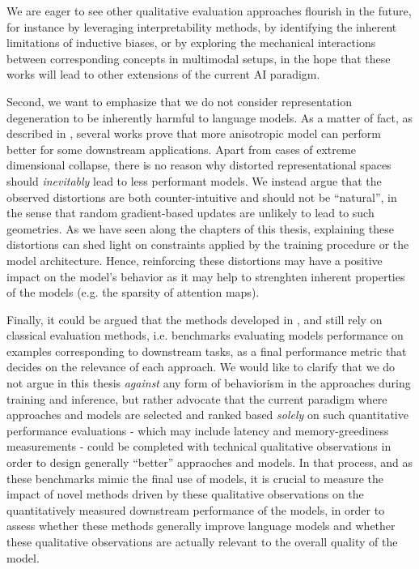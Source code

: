 We are eager to see other qualitative evaluation approaches flourish in the future, for instance by leveraging interpretability methods, by identifying the inherent limitations of inductive biases, or by exploring the mechanical interactions between corresponding concepts in multimodal setups, in the hope that these works will lead to other extensions of the current AI paradigm.

Second, we want to emphasize that we do not consider representation degeneration to be inherently harmful to language models. As a matter of fact, as described in , several works prove that more anisotropic model can perform better for some downstream applications. Apart from cases of extreme dimensional collapse, there is no reason why distorted representational spaces should \textit{inevitably} lead to less performant models. We instead argue that the observed distortions are both counter-intuitive and should not be ``natural'', in the sense that random gradient-based updates are unlikely to lead to such geometries. As we have seen along the chapters of this thesis, explaining these distortions can shed light on constraints applied by the training procedure or the model architecture. Hence, reinforcing these distortions may have a positive impact on the model's behavior as it may help to strenghten inherent properties of the models (e.g. the sparsity of attention maps).

Finally, it could be argued that the methods developed in ,  and  still rely on classical evaluation methods, i.e. benchmarks evaluating models performance on examples corresponding to downstream tasks, as a final performance metric that decides on the relevance of each approach. We would like to clarify that we do not argue in this thesis \textit{against} any form of behaviorism in the approaches during training and inference, but rather advocate that the current paradigm where approaches and models are selected and ranked based \textit{solely} on such quantitative performance evaluations - which may include latency and memory-greediness measurements - could be completed with technical qualitative observations in order to design generally ``better'' appraoches and models. In that process, and as these benchmarks mimic the final use of models, it is crucial to measure the impact of novel methods driven by these qualitative observations on the quantitatively measured downstream performance of the models, in order to assess whether these methods generally improve language models and whether these qualitative observations are actually relevant to the overall quality of the model.


